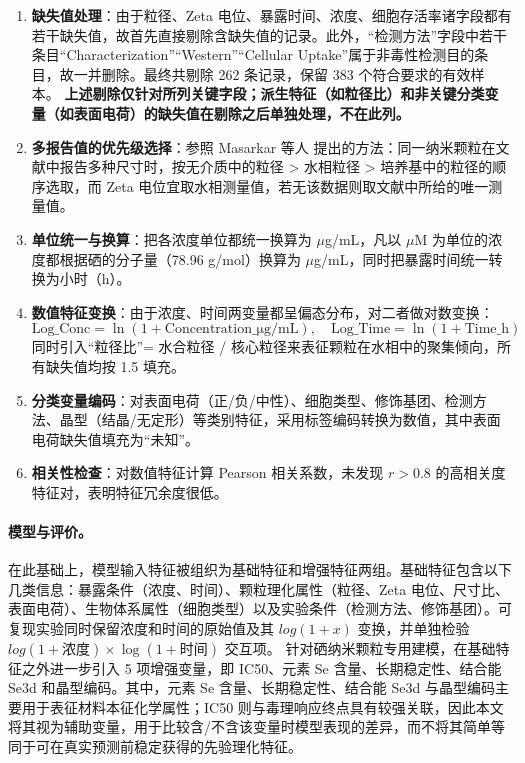 \begin{enumerate}
  \item \textbf{缺失值处理}：由于粒径、Zeta 电位、暴露时间、浓度、细胞存活率诸字段都有若干缺失值，故首先直接剔除含缺失值的记录。此外，“检测方法”字段中若干条目“Characterization”“Western”“Cellular Uptake”属于非毒性检测目的条目，故一并删除。最终共剔除 262 条记录，保留 383 个符合要求的有效样本。
  \textbf{上述剔除仅针对所列关键字段；派生特征（如粒径比）和非关键分类变量（如表面电荷）的缺失值在剔除之后单独处理，不在此列。}

  \item \textbf{多报告值的优先级选择}：参照 Masarkar 等人 \cite{masarkar2024} 提出的方法：同一纳米颗粒在文献中报告多种尺寸时，按无介质中的粒径 > 水相粒径 > 培养基中的粒径的顺序选取，而 Zeta 电位宜取水相测量值，若无该数据则取文献中所给的唯一测量值。

  \item \textbf{单位统一与换算}：把各浓度单位都统一换算为 $\mu$g/mL，凡以 $\mu$M 为单位的浓度都根据硒的分子量（78.96 g/mol）换算为 $\mu$g/mL，同时把暴露时间统一转换为小时（h）。

  \item \textbf{数值特征变换}：由于浓度、时间两变量都呈偏态分布，对二者做对数变换：
        \[
          \text{Log\_Conc} = \ln(1 + \text{Concentration\_μg/mL}), \quad
          \text{Log\_Time} = \ln(1 + \text{Time\_h})
        \]
        同时引入“粒径比”= 水合粒径 / 核心粒径来表征颗粒在水相中的聚集倾向，所有缺失值均按 1.5 填充。

  \item \textbf{分类变量编码}：对表面电荷（正/负/中性）、细胞类型、修饰基团、检测方法、晶型（结晶/无定形）等类别特征，采用标签编码转换为数值，其中表面电荷缺失值填充为“未知”。

  \item \textbf{相关性检查}：对数值特征计算 Pearson 相关系数，未发现 $r > 0.8$ 的高相关度特征对，表明特征冗余度很低。
\end{enumerate}

\paragraph{模型与评价。}

在此基础上，模型输入特征被组织为基础特征和增强特征两组。基础特征包含以下几类信息：暴露条件（浓度、时间）、颗粒理化属性（粒径、Zeta 电位、尺寸比、表面电荷）、生物体系属性（细胞类型）以及实验条件（检测方法、修饰基团）。可复现实验同时保留浓度和时间的原始值及其 $log(1+x)$ 变换，并单独检验 $log(1+浓度)\times\log(1+时间)$ 交互项。
针对硒纳米颗粒专用建模，在基础特征之外进一步引入 5 项增强变量，即 IC50、元素 Se 含量、长期稳定性、结合能 Se3d 和晶型编码。其中，元素 Se 含量、长期稳定性、结合能 Se3d 与晶型编码主要用于表征材料本征化学属性；IC50 则与毒理响应终点具有较强关联，因此本文将其视为辅助变量，用于比较含/不含该变量时模型表现的差异，而不将其简单等同于可在真实预测前稳定获得的先验理化特征。


